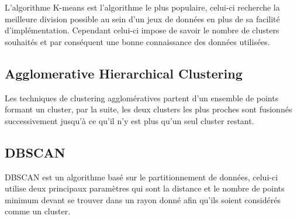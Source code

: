 \documentclass[memoire.tex]{subfiles}
\begin{document}
L'algorithme K-means est l'algorithme le plus populaire, celui-ci recherche la meilleure division possible au sein d'un jeux de données \cite{ref5} en plus de sa facilité d'implémentation. Cependant celui-ci impose de savoir le nombre de clusters souhaités et par conséquent une bonne connaissance des données utilisées.

\subsection{Agglomerative Hierarchical Clustering}

Les techniques de clustering agglomératives partent d'un ensemble de points formant un cluster, par la suite, les deux clusters les plus proches sont fusionnés successivement jusqu'à ce qu'il n'y est plus qu'un seul cluster restant. \cite{ref4}

\subsection{DBSCAN}

DBSCAN est un algorithme basé sur le partitionnement de données, celui-ci utilise deux principaux paramètres qui sont la distance et le nombre de points minimum devant se trouver dans un rayon donné afin qu'ils soient considérés comme un cluster.
\end{document}
